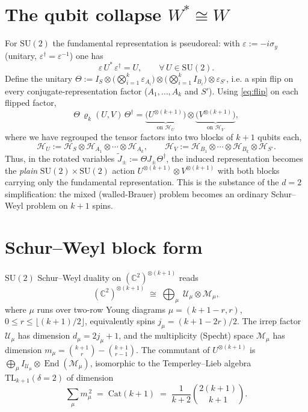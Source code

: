 \documentclass[11pt]{article}
\newcommand{\CC}{\mathbb{C}}
\newcommand{\HH}{\mathcal{H}}
\newcommand{\SU}{\mathrm{SU}}
\newcommand{\ox}{\otimes}
\newcommand{\dg}{\dagger}
\newcommand{\Hu}{\HH_U}
\newcommand{\Hv}{\HH_V}
\begin{document}
\section{The qubit collapse $W^\ast\cong W$}
For $\SU(2)$ the fundamental representation is pseudoreal: with $\varepsilon:=-i\sigma_y$
(unitary, $\varepsilon^\dg=\varepsilon^{-1}$) one has
\begin{equation}\label{eq:flip}
\varepsilon\,U^\ast\,\varepsilon^{\dg}=U,\qquad\forall\,U\in\SU(2).
\end{equation}
Define the unitary $\Theta:=I_S\ox\big(\bigotimes_{i=1}^k\varepsilon_{A_i}\big)\ox
\big(\bigotimes_{i=1}^k I_{B_i}\big)\ox\varepsilon_{S'}$, i.e. a spin flip on every
conjugate-representation factor ($A_1,\dots,A_k$ and $S'$). Using \eqref{eq:flip} on each
flipped factor,
\begin{equation}\label{eq:rhotilde}
\Theta\,\varrho_k(U,V)\,\Theta^\dg
=\underbrace{\big(U^{\ox(k+1)}\big)}_{\text{on }\Hu}\ox
 \underbrace{\big(V^{\ox(k+1)}\big)}_{\text{on }\Hv},
\end{equation}
where we have regrouped the tensor factors into two blocks of $k+1$ qubits each,
\begin{equation}
\Hu:=\HH_S\ox\HH_{A_1}\ox\cdots\ox\HH_{A_k},\qquad
\Hv:=\HH_{B_1}\ox\cdots\ox\HH_{B_k}\ox\HH_{S'} .
\end{equation}
Thus, in the rotated variables $\widetilde J_\pm:=\Theta J_\pm\Theta^\dg$, the induced
representation becomes the \emph{plain} $\SU(2)\times\SU(2)$ action
$U^{\ox(k+1)}\ox V^{\ox(k+1)}$ with both blocks carrying only the fundamental
representation. This is the substance of the $d=2$ simplification: the mixed (walled-Brauer)
problem becomes an ordinary Schur--Weyl problem on $k+1$ spins.

\section{Schur--Weyl block form}
$\SU(2)$ Schur--Weyl duality on $(\CC^2)^{\ox(k+1)}$ reads
\begin{equation}\label{eq:sw}
(\CC^2)^{\ox(k+1)}\;\cong\;\bigoplus_{\mu}\;\mathcal{U}_\mu\ox\mathcal{M}_\mu,
\end{equation}
where $\mu$ runs over two-row Young diagrams $\mu=(k+1-r,r)$, $0\le r\le\lfloor(k+1)/2\rfloor$,
equivalently spins $j_\mu=(k+1-2r)/2$. The irrep factor $\mathcal{U}_\mu$ has dimension
$d_\mu=2j_\mu+1$, and the multiplicity (Specht) space $\mathcal{M}_\mu$ has dimension
$m_\mu=\binom{k+1}{r}-\binom{k+1}{r-1}$. The commutant of $U^{\ox(k+1)}$ is
$\bigoplus_\mu I_{\mathcal{U}_\mu}\ox\operatorname{End}(\mathcal{M}_\mu)$, isomorphic to the
Temperley--Lieb algebra $\mathrm{TL}_{k+1}(\delta\!=\!2)$ of dimension
\begin{equation}
\sum_\mu m_\mu^{\,2}\;=\;\mathrm{Cat}(k+1)\;=\;\frac{1}{k+2}\binom{2(k+1)}{k+1}.
\end{equation}
\end{document}
